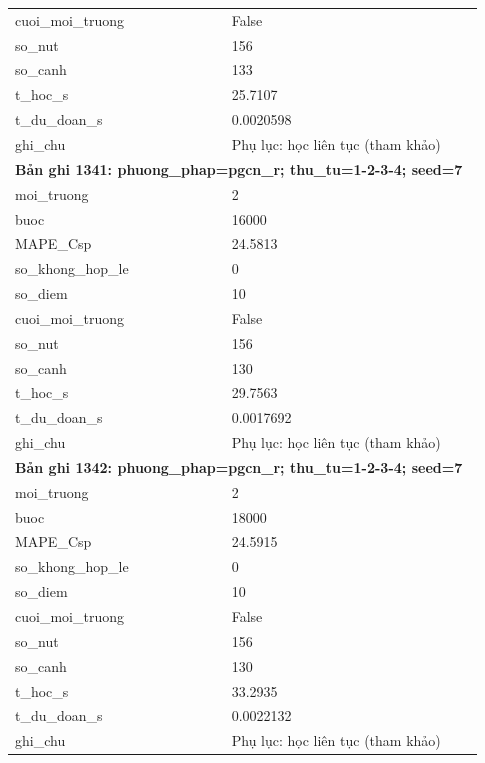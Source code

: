 \begin{longtable}{p{0.43\linewidth}p{0.50\linewidth}}
cuoi\_\allowbreak moi\_\allowbreak truong & False \\
so\_\allowbreak nut & 156 \\
so\_\allowbreak canh & 133 \\
t\_\allowbreak hoc\_\allowbreak s & 25.7107 \\
t\_\allowbreak du\_\allowbreak doan\_\allowbreak s & 0.0020598 \\
ghi\_\allowbreak chu & Phụ lục: học liên tục (tham khảo) \\
\midrule
\multicolumn{2}{p{0.95\linewidth}}{\textbf{Bản ghi 1341: phuong\_phap=pgcn\_r; thu\_tu=1-2-3-4; seed=7}} \\
moi\_\allowbreak truong & 2 \\
buoc & 16000 \\
MAPE\_\allowbreak Csp & 24.5813 \\
so\_\allowbreak khong\_\allowbreak hop\_\allowbreak le & 0 \\
so\_\allowbreak diem & 10 \\
cuoi\_\allowbreak moi\_\allowbreak truong & False \\
so\_\allowbreak nut & 156 \\
so\_\allowbreak canh & 130 \\
t\_\allowbreak hoc\_\allowbreak s & 29.7563 \\
t\_\allowbreak du\_\allowbreak doan\_\allowbreak s & 0.0017692 \\
ghi\_\allowbreak chu & Phụ lục: học liên tục (tham khảo) \\
\midrule
\multicolumn{2}{p{0.95\linewidth}}{\textbf{Bản ghi 1342: phuong\_phap=pgcn\_r; thu\_tu=1-2-3-4; seed=7}} \\
moi\_\allowbreak truong & 2 \\
buoc & 18000 \\
MAPE\_\allowbreak Csp & 24.5915 \\
so\_\allowbreak khong\_\allowbreak hop\_\allowbreak le & 0 \\
so\_\allowbreak diem & 10 \\
cuoi\_\allowbreak moi\_\allowbreak truong & False \\
so\_\allowbreak nut & 156 \\
so\_\allowbreak canh & 130 \\
t\_\allowbreak hoc\_\allowbreak s & 33.2935 \\
t\_\allowbreak du\_\allowbreak doan\_\allowbreak s & 0.0022132 \\
ghi\_\allowbreak chu & Phụ lục: học liên tục (tham khảo) \\

\end{longtable}
